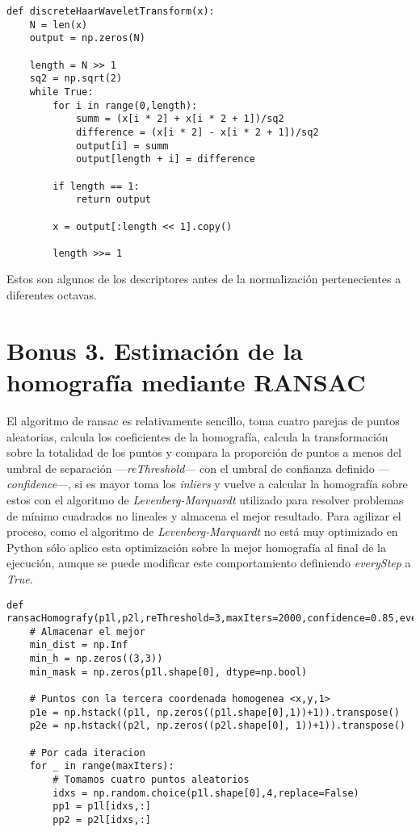 \documentclass{article}
\newcommand{\img}[2]{
\noindent\makebox[\textwidth][c]{\texttt{[image: \#1]}}%
}
\begin{document}
\begin{lstlisting}
def discreteHaarWaveletTransform(x):
    N = len(x)
    output = np.zeros(N)

    length = N >> 1
    sq2 = np.sqrt(2)
    while True:
        for i in range(0,length):
            summ = (x[i * 2] + x[i * 2 + 1])/sq2
            difference = (x[i * 2] - x[i * 2 + 1])/sq2
            output[i] = summ
            output[length + i] = difference

        if length == 1:
            return output

        x = output[:length << 1].copy()

        length >>= 1
\end{lstlisting}

Estos son algunos de los descriptores antes de la normalización pertenecientes a diferentes octavas.
\\

\img{img/b2_1}{1}

\section{Bonus 3. Estimación de la homografía mediante RANSAC}

El algoritmo de ransac es relativamente sencillo, toma cuatro parejas de puntos aleatorias, calcula los coeficientes de la homografía, calcula la transformación sobre la totalidad de los puntos y compara la proporción de puntos a menos del umbral de separación ---\textit{reThreshold}--- con el umbral de confianza definido ---\textit{confidence}---, si es mayor toma los \textit{inliers} y vuelve a calcular la homografía sobre estos con el algoritmo de \textit{Levenberg-Marquardt} utilizado para resolver problemas de mínimo cuadrados no lineales y almacena el mejor resultado. Para agilizar el proceso, como el algoritmo de \textit{Levenberg-Marquardt} no está muy optimizado en Python sólo aplico esta optimización sobre la mejor homografía al final de la ejecución, aunque se puede modificar este comportamiento definiendo \textit{everyStep} a \textit{True}.

\begin{lstlisting}
def ransacHomografy(p1l,p2l,reThreshold=3,maxIters=2000,confidence=0.85,everyStep=False):
    # Almacenar el mejor
    min_dist = np.Inf
    min_h = np.zeros((3,3))
    min_mask = np.zeros(p1l.shape[0], dtype=np.bool)
	
	# Puntos con la tercera coordenada homogenea <x,y,1>
    p1e = np.hstack((p1l, np.zeros((p1l.shape[0],1))+1)).transpose()
    p2e = np.hstack((p2l, np.zeros((p2l.shape[0], 1))+1)).transpose()
    
    # Por cada iteracion
    for _ in range(maxIters):
        # Tomamos cuatro puntos aleatorios
        idxs = np.random.choice(p1l.shape[0],4,replace=False)
        pp1 = p1l[idxs,:]
        pp2 = p2l[idxs,:]
\end{lstlisting}
\end{document}
